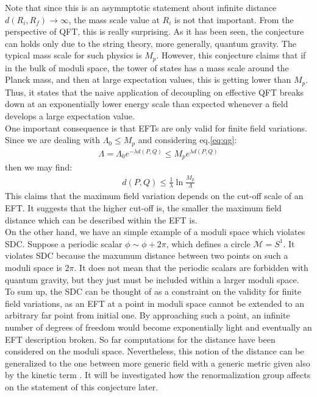 Note that since this is an asymmptotic statement about infinite distance $d(R_{i}, R_{f}) \to \infty$, the mass scale value at $R_{i}$ is not that important. From the perspective of QFT, this is really surprising. As it has been seen, the conjecture can holds only due to the string theory, more generally, quantum gravity. The typical mass scale for such physics is $M_{p}$. However, this conjecture claims that if in the bulk of moduli space, the tower of states has a mass scale around the Planck mass, and then at large expectation values, this is getting lower than $M_{p}$. Thus, it states that the naive application of decoupling on effective QFT breaks down at an exponentially lower energy scale than expected whenever a field develops a large expectation value.\\
\indent One important consequence is that EFTs are only valid for finite field variations. Since we are dealing with $\Lambda _{0} \leq M_{p}$ and considering eq.\ref{eq:qg}:
\begin{align}
    \Lambda = \Lambda_{0} e^{-\lambda d(P,Q)} \leq M_{p} e^{\lambda d(P,Q)}
\end{align}
then we may find:
\begin{align}
    d(P,Q) \leq \frac{1}{\lambda} \ln \frac{M_{p}}{\Lambda}
\end{align}
This claims that the maximum field variation depends on the cut-off scale of an EFT. It suggests that the higher cut-off is, the smaller the maximum field distance which can be described within the EFT is. \\
\indent On the other hand, we have an simple example of a moduli space which violates SDC. Suppose a periodic scalar $\phi \sim \phi + 2\pi$, which defines a circle $\mathcal{M} = S^{1}$. It violates SDC because the maxumum distance between two points on such a moduli space is $2\pi$. It does not mean that the periodic scalars are forbidden with quantum gravity, but they just must be included within a larger moduli space. \\
\indent To sum up, the SDC can be thought of as a constraint on the validity for finite field variations, as an EFT at a point in moduli space cannot be extended to an arbitrary far point from initial one. By approaching such a point, an infinite number of degrees of freedom would become exponentially light and eventually an EFT description broken. So far computations for the distance have been considered on the moduli space. Nevertheless, this notion of the distance can be generalized to the one between more generic field with a generic metric given also by the kinetic term \parencite{lust_ads_2019}. It will be investigated how the renormalization group affects on the statement of this conjecture later. \\
